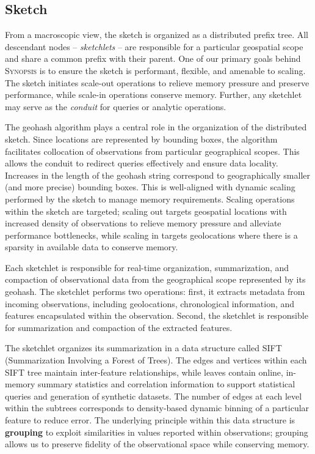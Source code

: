 \subsection{Sketch}
From a macroscopic view, the sketch is organized as a distributed prefix tree. All descendant nodes -- \emph{sketchlets} -- are responsible for a particular geospatial scope and share a common prefix with their parent. One of our primary goals behind \textsc{Synopsis} is to ensure the sketch is performant, flexible, and amenable to scaling. The sketch initiates scale-out operations to relieve memory pressure and preserve performance, while scale-in operations conserve memory. Further, any sketchlet may serve as the \emph{conduit} for queries or analytic operations.

The geohash algorithm plays a central role in the organization of the distributed sketch. Since locations are represented by bounding boxes, the algorithm facilitates collocation of observations from particular geographical scopes. This allows the conduit to redirect queries effectively and ensure data locality. Increases in the length of the geohash string correspond to geographically smaller (and more precise) bounding boxes. This is well-aligned with dynamic scaling performed by the sketch to manage memory requirements. Scaling operations within the sketch are targeted; scaling out targets geospatial locations with increased density of observations to relieve memory pressure and alleviate performance bottlenecks, while scaling in targets geolocations where there is a sparsity in available data to conserve memory.


Each sketchlet is responsible for real-time organization, summarization, and compaction of observational data from the geographical scope represented by its geohash. The sketchlet performs two operations: first, it extracts metadata from incoming observations, including geolocations, chronological information, and features encapsulated within the observation. Second, the sketchlet is responsible for summarization and compaction of the extracted features.

The sketchlet organizes its summarization in a data structure called SIFT (Summarization Involving a Forest of Trees). The edges and vertices within each SIFT tree maintain inter-feature relationships, while leaves contain online, in-memory summary statistics and correlation information to support statistical queries and generation of synthetic datasets.  The number of edges at each level within the subtrees corresponds to density-based dynamic binning of a particular feature to reduce error. The underlying principle within this data structure is \textbf{grouping} to exploit similarities in values reported within observations; grouping allows us to preserve fidelity of the observational space while conserving memory.

